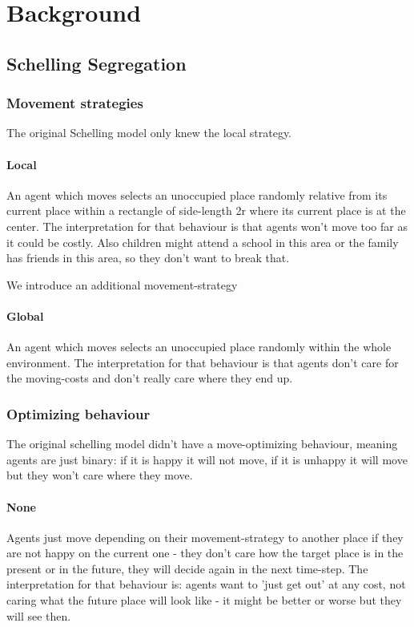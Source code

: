 \section{Background}
\subsection{Schelling Segregation}

\subsubsection{Movement strategies}
The original Schelling model only knew the local strategy.

\paragraph{Local} An agent which moves selects an unoccupied place randomly relative from its current place within a rectangle of side-length 2r where its current place is at the center. The interpretation for that behaviour is that agents won't move too far as it could be costly. Also children might attend a school in this area or the family has friends in this area, so they don't want to break that.

We introduce an additional movement-strategy

\paragraph{Global} An agent which moves selects an unoccupied place randomly within the whole environment. The interpretation for that behaviour is that agents don't care for the moving-costs and don't really care where they end up. 

\subsubsection{Optimizing behaviour}
The original schelling model didn't have a move-optimizing behaviour, meaning agents are just binary: if it is happy it will not move, if it is unhappy it will move but they won't care where they move. 

\paragraph{None} Agents just move depending on their movement-strategy to another place if they are not happy on the current one - they don't care how the target place is in the present or in the future, they will decide again in the next time-step. The interpretation for that behaviour is: agents want to 'just get out' at any cost, not caring what the future place will look like - it might be better or worse but they will see then.

